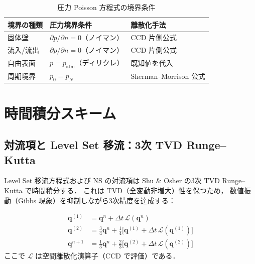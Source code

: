\documentclass[12pt, a4paper, titlepage]{article}
\newcommand{\jp}[1]{{\normalfont\jpfont #1}}
\begin{document}
\begin{table}[h]
\centering
\caption{\jp{圧力 Poisson 方程式の境界条件}}
\begin{tabular}{lll}
\toprule
\jp{境界の種類} & \jp{圧力境界条件} & \jp{離散化手法}\\
\midrule
\jp{固体壁} & $\partial p/\partial n = 0$\jp{（ノイマン）} & CCD \jp{片側公式}\\
\jp{流入/流出} & $\partial p/\partial n = 0$\jp{（ノイマン）} & CCD \jp{片側公式}\\
\jp{自由表面} & $p = p_{\mathrm{atm}}$\jp{（ディリクレ）} & \jp{既知値を代入}\\
\jp{周期境界} & $p_0 = p_N$ & Sherman--Morrison \jp{公式}\\
\bottomrule
\end{tabular}
\end{table}


\section{\jp{時間積分スキーム}}
\label{sec:time}

\subsection{\jp{対流項と Level Set 移流：3次 TVD Runge--Kutta}}

\jp{Level Set 移流方程式および NS の対流項は
Shu \& Osher \cite{ShuOsher1988} の3次 TVD Runge--Kutta で時間積分する．
これは TVD（全変動非増大）性を保つため，
数値振動（Gibbs 現象）を抑制しながら3次精度を達成する：}

\begin{tcolorbox}[mybox, title={3\jp{次} TVD Runge--Kutta \jp{（Shu--Osher スキーム）}}]
\begin{align}
  \bm{q}^{(1)} &= \bm{q}^n + \Delta t\,\mathcal{L}(\bm{q}^n)
  \label{eq:TVDRK3_1}\\[4pt]
  \bm{q}^{(2)} &= \frac{3}{4}\bm{q}^n
               + \frac{1}{4}\bigl[\bm{q}^{(1)} + \Delta t\,\mathcal{L}(\bm{q}^{(1)})\bigr]
  \label{eq:TVDRK3_2}\\[4pt]
  \bm{q}^{n+1} &= \frac{1}{3}\bm{q}^n
               + \frac{2}{3}\bigl[\bm{q}^{(2)} + \Delta t\,\mathcal{L}(\bm{q}^{(2)})\bigr]
  \label{eq:TVDRK3_3}
\end{align}
\jp{ここで $\mathcal{L}$ は空間離散化演算子（CCD で評価）である．}
\end{tcolorbox}
\end{document}
